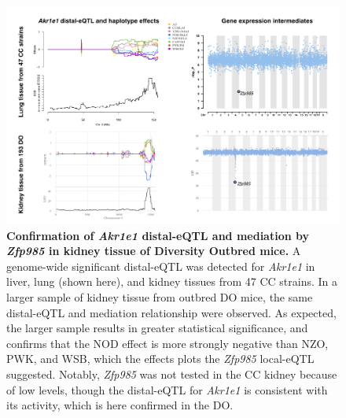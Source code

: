 \documentclass[9pt,twocolumn,twoside]{gsajnl}
\begin{document}
\begin{figure}[hp]
\renewcommand{\familydefault}{\sfdefault}\normalfont
\centering
\includegraphics[width=\textwidth, trim={0in 0in 0in 0in}, clip]{figs/do_confirmation_akr1e1.png}
\caption{\textbf{Confirmation of \textit{Akr1e1} distal-eQTL and mediation by \textit{Zfp985} in kidney tissue of Diversity Outbred mice.} 
A genome-wide significant distal-eQTL was detected for \textit{Akr1e1} in liver, lung (shown here), and kidney tissues from 47 CC strains. In a larger sample of kidney tissue from outbred DO mice, the same distal-eQTL and mediation relationship were observed. As expected, the larger sample results in greater statistical significance, and confirms that the NOD effect is more strongly negative than NZO, PWK, and WSB, which the effects plots the \textit{Zfp985} local-eQTL suggested. Notably, \textit{Zfp985} was not tested in the CC kidney because of low levels, though the distal-eQTL for \textit{Akr1e1} is consistent with its activity, which is here confirmed in the DO.
\label{fig:do_akr1e1}}
\end{figure}

\clearpage
\end{document}
